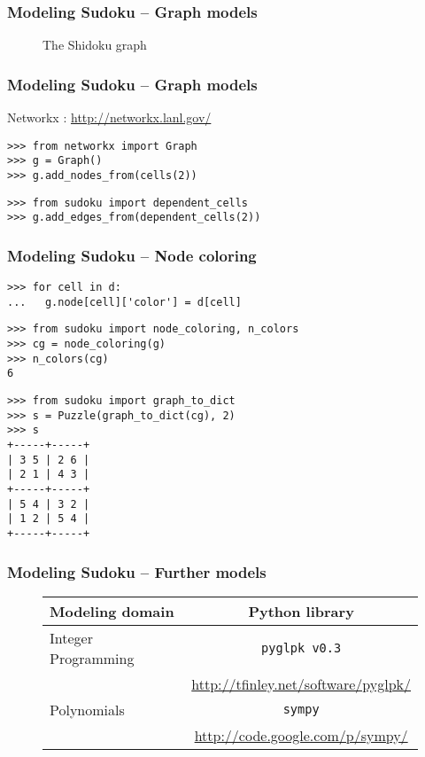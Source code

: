 \documentclass{beamer}
\begin{document}
\begin{frame}[fragile]
\frametitle{Modeling Sudoku -- Graph models}
  \begin{figure}[h]
   \centering
  \begin{dot2tex}[circo,mathmode,options={--graphstyle "scale=0.25"}]
   
  \end{dot2tex}
  \caption{The Shidoku graph}
 \end{figure}
\end{frame}

\begin{frame}[fragile]
\frametitle{Modeling Sudoku -- Graph models}
Networkx : \url{http://networkx.lanl.gov/}

\begin{lstlisting}
>>> from networkx import Graph
>>> g = Graph()
>>> g.add_nodes_from(cells(2))
\end{lstlisting}

\pause

\begin{lstlisting}
>>> from sudoku import dependent_cells
>>> g.add_edges_from(dependent_cells(2))
\end{lstlisting}
\end{frame}

\begin{frame}[fragile]
\frametitle{Modeling Sudoku -- Node coloring}
\begin{lstlisting}
>>> for cell in d:
...   g.node[cell]['color'] = d[cell]
\end{lstlisting}

\pause

\begin{lstlisting}
>>> from sudoku import node_coloring, n_colors
>>> cg = node_coloring(g)
>>> n_colors(cg)
6
\end{lstlisting}

\pause

\begin{lstlisting}
>>> from sudoku import graph_to_dict
>>> s = Puzzle(graph_to_dict(cg), 2)
>>> s
+-----+-----+
| 3 5 | 2 6 | 
| 2 1 | 4 3 | 
+-----+-----+
| 5 4 | 3 2 | 
| 1 2 | 5 4 | 
+-----+-----+
\end{lstlisting}

\end{frame}

\begin{frame}[fragile]
\frametitle{Modeling Sudoku -- Further models}
 \begin{figure}[h]
  \centering
  \begin{tabular}{ l c }
  Modeling domain    & Python library \\ \hline
  Integer Programming & \texttt{pyglpk v0.3} \\
                     & \url{http://tfinley.net/software/pyglpk/} \\
  Polynomials        & \texttt{sympy} \\
                     & \url{http://code.google.com/p/sympy/}
  \end{tabular}
 \end{figure} 
\end{frame}
\end{document}
